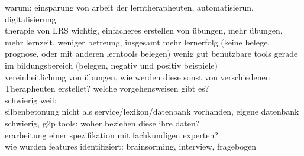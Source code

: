 warum: einsparung von arbeit der lerntherapheuten, automatisierun, digitalisierung\\
therapie von LRS wichtig, einfacheres erstellen von übungen, mehr übungen, mehr lernzeit, weniger betreung, insgesamt mehr lernerfolg (keine belege, prognose, oder mit anderen lerntools belegen)
wenig gut benutzbare tools gerade im bildungsbereich (belegen, negativ und positiv beispiele)\\
vereinheitlichung von übungen, wie werden diese sonst von verschiedenen Therapheuten erstellet? welche vorgehensweisen gibt es?\\
schwierig weil: \\
silbenbetonung nicht als service/lexikon/datenbank vorhanden, eigene datenbank schwierig, g2p tools: woher beziehen diese ihre daten?\\
erarbeitung einer spezifikation mit fachkundigen experten? \\
wie wurden features identifiziert: brainsorming, interview, fragebogen






